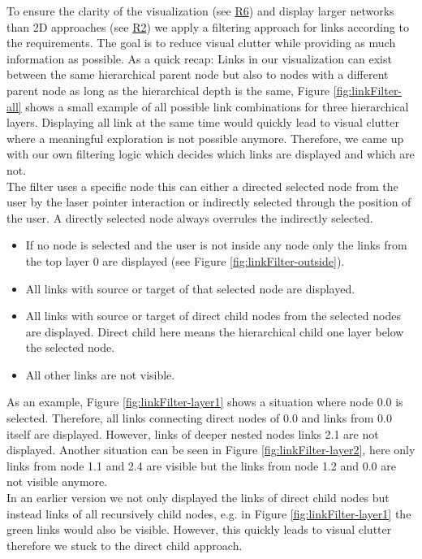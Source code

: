 To ensure the clarity of the visualization (see \hyperref[req:R6]{R6}) and display larger networks than 2D approaches (see \hyperref[req:R2]{R2}) we apply a filtering approach for links according to the requirements. 
The goal is to reduce visual clutter while providing as much information as possible. 
As a quick recap: Links in our visualization can exist between the same hierarchical parent node but also to nodes with a different parent node as long as the hierarchical depth is the same, Figure \ref{fig:linkFilter-all} shows a small example of all possible link combinations for three hierarchical layers.
Displaying all link at the same time would quickly lead to visual clutter where a meaningful exploration is not possible anymore. 
Therefore, we came up with our own filtering logic which decides which links are displayed and which are not.\\ 
The filter uses a specific node this can either a directed selected node from the user by the laser pointer interaction or indirectly selected through the position of the user. A directly selected node always overrules the indirectly selected.

\begin{itemize}
    \item If no node is selected and the user is not inside any node only the links from the top layer 0 are displayed (see Figure \ref{fig:linkFilter-outside}).
    \item All links with source or target of that selected node are displayed. 
    \item All links with source or target of direct child nodes from the selected nodes are displayed. Direct child here means the hierarchical child one layer below the selected node. 
    \item All other links are not visible.
\end{itemize}

As an example, Figure \ref{fig:linkFilter-layer1} shows a situation where node 0.0 is selected. Therefore, all links connecting direct nodes of 0.0 and links from 0.0 itself are displayed. However, links of deeper nested nodes links 2.1 are not displayed. 
Another situation can be seen in Figure \ref{fig:linkFilter-layer2}, here only links from node 1.1 and 2.4 are visible but the links from node 1.2 and 0.0 are not visible anymore.\\
In an earlier version we not only displayed the links of direct child nodes but instead links of all recursively child nodes, e.g. in Figure \ref{fig:linkFilter-layer1} the green links would also be visible. However, this quickly leads to visual clutter therefore we stuck to the direct child approach.

